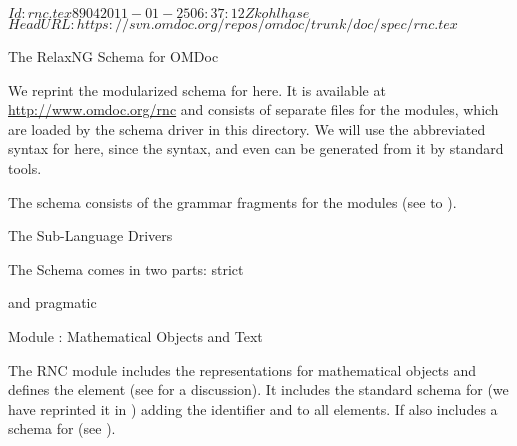 \svnInfo $Id: rnc.tex 8904 2011-01-25 06:37:12Z kohlhase $
\svnKeyword $HeadURL: https://svn.omdoc.org/repos/omdoc/trunk/doc/spec/rnc.tex $

\begin{omgroup}[id=rnc]{The RelaxNG Schema for OMDoc}

We reprint the modularized {\relaxng} schema for {\omdoc} here. It is available at
\url{http://www.omdoc.org/rnc} and consists of separate files for the {\omdoc} modules,
which are loaded by the schema driver {} in this directory. We will use
the abbreviated syntax for {\relaxng} here, since the {\xml} syntax,  and even  can be generated
from it by standard tools.

The {\relaxng} schema consists of the grammar fragments for the modules (see
{ to }).

\begin{omgroup}[id=rnc.drivers]{The Sub-Language Drivers}

The Schema comes in two parts: strict {\omdoc}


 
and pragmatic {\omdoc}


\end{omgroup}

\begin{omgroup}[id=rnc.math]{Module {}: Mathematical Objects and Text}

The RNC module {} includes the representations for mathematical objects
and defines the {} element (see {} for a discussion). It
includes the standard {\relaxng} schema for {\openmath} (we have reprinted it in
{}) adding the {\omdoc} identifier and {\css}
 to all elements. If also includes a schema for
{\mathml} (see {}).


\end{omgroup}
\end{omgroup}
